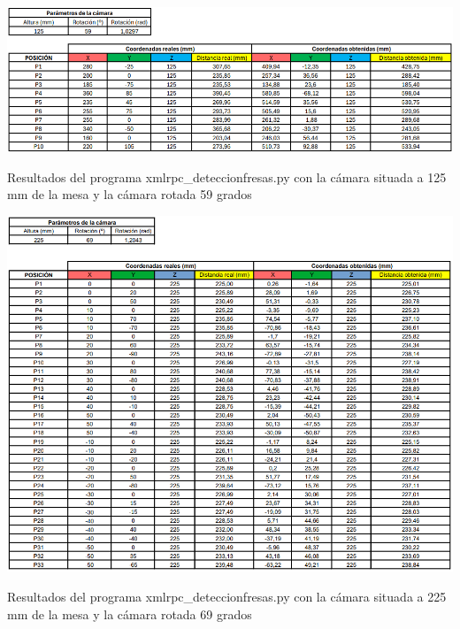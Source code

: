   \begin{table}[H]
     \centering
     \begin{center}
       \includegraphics[width=155mm]{figs/Resultados 125 mm 59 grados.png}
     \end{center}
     \caption{Resultados del programa xmlrpc\_deteccionfresas.py con la cámara situada a 125 mm de la mesa y la cámara rotada 59 grados}
     \label{tab:resultados_125mm_59grados}
  \end{table}

  \begin{table}[H]
     \centering
     \begin{center}
       \includegraphics[width=155mm]{figs/Resultados 225 mm 69 grados.png}
     \end{center}
     \caption{Resultados del programa xmlrpc\_deteccionfresas.py con la cámara situada a 225 mm de la mesa y la cámara rotada 69 grados}
     \label{tab:resultados_225mm_69grados}
  \end{table}  
  
